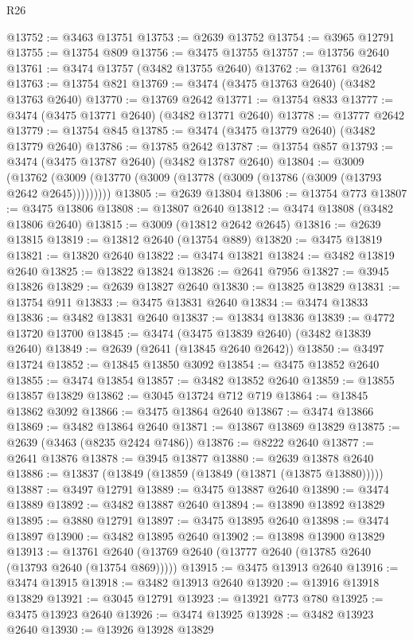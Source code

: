 \begin{lexlean}{R26}
\begin{coremodule}
@13752 := @3463 @13751
@13753 := @2639 @13752
@13754 := @3965 @12791
@13755 := @13754 @809
@13756 := @3475 @13755
@13757 := @13756 @2640
@13761 := @3474 @13757 (@3482 @13755 @2640)
@13762 := @13761 @2642
@13763 := @13754 @821
@13769 := @3474 (@3475 @13763 @2640) (@3482 @13763 @2640)
@13770 := @13769 @2642
@13771 := @13754 @833
@13777 := @3474 (@3475 @13771 @2640) (@3482 @13771 @2640)
@13778 := @13777 @2642
@13779 := @13754 @845
@13785 := @3474 (@3475 @13779 @2640) (@3482 @13779 @2640)
@13786 := @13785 @2642
@13787 := @13754 @857
@13793 := @3474 (@3475 @13787 @2640) (@3482 @13787 @2640)
@13804 := @3009
    (@13762 (@3009 (@13770 (@3009 (@13778 (@3009 (@13786 (@3009 (@13793 @2642 @2645)))))))))
@13805 := @2639 @13804
@13806 := @13754 @773
@13807 := @3475 @13806
@13808 := @13807 @2640
@13812 := @3474 @13808 (@3482 @13806 @2640)
@13815 := @3009 (@13812 @2642 @2645)
@13816 := @2639 @13815
@13819 := @13812 @2640 (@13754 @889)
@13820 := @3475 @13819
@13821 := @13820 @2640
@13822 := @3474 @13821
@13824 := @3482 @13819 @2640
@13825 := @13822 @13824
@13826 := @2641 @7956
@13827 := @3945 @13826
@13829 := @2639 @13827 @2640
@13830 := @13825 @13829
@13831 := @13754 @911
@13833 := @3475 @13831 @2640
@13834 := @3474 @13833
@13836 := @3482 @13831 @2640
@13837 := @13834 @13836
@13839 := @4772 @13720 @13700
@13845 := @3474 (@3475 @13839 @2640) (@3482 @13839 @2640)
@13849 := @2639 (@2641 (@13845 @2640 @2642))
@13850 := @3497 @13724
@13852 := @13845 @13850 @3092
@13854 := @3475 @13852 @2640
@13855 := @3474 @13854
@13857 := @3482 @13852 @2640
@13859 := @13855 @13857 @13829
@13862 := @3045 @13724 @712 @719
@13864 := @13845 @13862 @3092
@13866 := @3475 @13864 @2640
@13867 := @3474 @13866
@13869 := @3482 @13864 @2640
@13871 := @13867 @13869 @13829
@13875 := @2639 (@3463 (@8235 @2424 @7486))
@13876 := @8222 @2640
@13877 := @2641 @13876
@13878 := @3945 @13877
@13880 := @2639 @13878 @2640
@13886 := @13837 (@13849 (@13859 (@13849 (@13871 (@13875 @13880)))))
@13887 := @3497 @12791
@13889 := @3475 @13887 @2640
@13890 := @3474 @13889
@13892 := @3482 @13887 @2640
@13894 := @13890 @13892 @13829
@13895 := @3880 @12791
@13897 := @3475 @13895 @2640
@13898 := @3474 @13897
@13900 := @3482 @13895 @2640
@13902 := @13898 @13900 @13829
@13913 := @13761 @2640 (@13769 @2640 (@13777 @2640 (@13785 @2640 (@13793 @2640 (@13754 @869)))))
@13915 := @3475 @13913 @2640
@13916 := @3474 @13915
@13918 := @3482 @13913 @2640
@13920 := @13916 @13918 @13829
@13921 := @3045 @12791
@13923 := @13921 @773 @780
@13925 := @3475 @13923 @2640
@13926 := @3474 @13925
@13928 := @3482 @13923 @2640
@13930 := @13926 @13928 @13829

\end{coremodule}
\end{lexlean}
